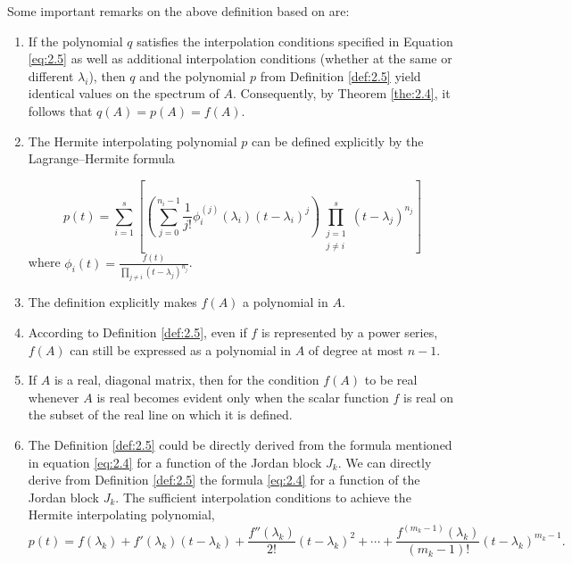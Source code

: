 \begin{remark}
    \label{rem:2.6}
    Some important remarks on the above definition based on \cite{8}are:
    \begin{enumerate}
    \item If the polynomial $q$ satisfies the interpolation conditions specified in Equation \ref{eq:2.5} as well as additional interpolation conditions (whether at the same or different $\lambda_i$), then $q$ and the polynomial  $p$ from Definition \ref{def:2.5} yield identical values on the spectrum of $A$. Consequently, by Theorem \ref{the:2.4}, it follows that $q(A) = p(A) = f(A)$.

    \item The Hermite interpolating polynomial $p$ can be defined explicitly by the Lagrange–Hermite formula

    \begin{equation}
        p(t) = \sum_{i=1}^{s} \left[ \left( \sum_{j=0}^{n_{i}-1} \frac{1}{j!} \phi_{i}^{(j)}(\lambda_{i})(t-\lambda_{i})^{j} \right) \prod_{\substack{j=1 \\ j \neq i}}^{s} (t-\lambda_{j})^{n_{j}} \right]
        \label{eq:2.6}
    \end{equation}
    where  $\phi_i(t) = \frac{f(t)}{\prod_{j \neq i} (t - \lambda_j)^{n_j}}$.

    \item The definition explicitly makes $f(A)$ a polynomial in $A$.

    \item According to Definition \ref{def:2.5}, even if $f$ is represented by a power series, $f(A)$ can still be expressed as a polynomial in $A$ of degree at most $n-1$.

    \item If $A$ is a real, diagonal matrix, then for the condition  $f(A)$ to be real whenever $A$ is real becomes evident only when the scalar function $f$ is real on the subset of the real line on which it is defined.

    \item The Definition \ref{def:2.5} could be directly derived from the formula mentioned in equation \ref{eq:2.4} for a function of the Jordan block $J_k$. 
    We can directly derive from Definition \ref{def:2.5} the formula \ref{eq:2.4} for a function of the Jordan block $J_k$. The sufficient interpolation conditions to achieve the Hermite interpolating polynomial,
    \[
        p(t) = f(\lambda_k) + f'(\lambda_k)(t - \lambda_k) + \frac{f''(\lambda_k)}{2!}(t - \lambda_k)^2 + \cdots + \frac{f^{(m_k-1)}(\lambda_k)}{(m_k-1)!}(t - \lambda_k)^{m_k-1}.
    \]

    \end{enumerate}
\end{remark}

